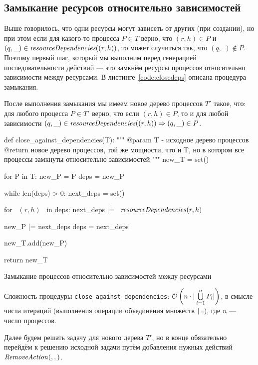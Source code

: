 \subsection{Замыкание ресурсов относительно зависимостей}

Выше говорилось, что одни ресурсы могут зависеть от других (при создании), но при этом если для какого-то процесса $P \in T$ верно, что $(r, h) \in P$ и $(q, \_) \in \text{\textit{resourceDependencies}}((r, h))$, то может случиться так, что $(q, \_) \notin P$. Поэтому первый шаг, который мы выполним перед генерацией последовательности действий --- это замкнём ресурсы процессов относительно зависимости между ресурсами. В листинге~\ref{code:closedeps} описана процедура замыкания. 

После выполнения замыкания мы имеем новое дерево процессов $T'$ такое, что: для любого процесса $P \in T'$ верно, что если $(r, h) \in P$, то и для любой зависимости $(q, \_) \in \text{\textit{resourceDependencies}}((r, h)) \Rightarrow (q, \_) \in P$.

\begin{listing}[ht!]
\begin{pythoncode}
def close_against_dependencies(T):
    """
    @param T - исходное дерево процессов
    @return новое дерево процессов, той же мощности, что и T, но в котором все процессы 
            замкнуты относительно зависимостей
    """
    new_T = set()

    for P in T:
        new_P = P
        deps = new_P

        while len(deps) > 0:
            next_deps = set()

            for ~$(r, h)$~ in deps:
                next_deps |= ~$\crdependenices{r, h}$~

            new_P |= next_deps
            deps = next_deps

        new_T.add(new_P)

    return new_T
\end{pythoncode}
\caption{Замыкание процессов относительно зависимостей между ресурсами}
\label{code:closedeps}
\end{listing}

Сложность процедуры \texttt{close\_against\_dependencies}: $\mathcal{O}\left(n\cdot|\bigcup\limits_{i = 1}^{n}{P_i}|\right)$, в смысле числа итераций (выполнения операции объединения множеств \texttt{|=}), где $n$ --- число процессов.

Далее будем решать задачу для нового дерева $T'$, но в конце обязательно перейдём к решению исходной задачи путём добавления нужных действий $\text{\textit{RemoveAction}}(, , )$.

